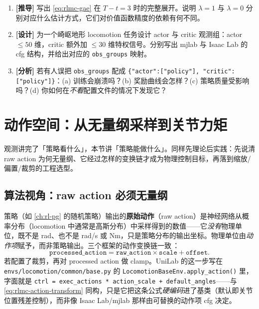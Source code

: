 \begin{practice}[练习·非对称观测]
\begin{enumerate}
  \item \textbf{[推导]} 写出 \cref{eq:rlmc-gae} 在 $T-t=3$ 时的完整展开。说明 $\lambda=1$ 与 $\lambda=0$ 分别对应什么估计方式，它们对价值函数精度的依赖有何不同。
  \item \textbf{[设计]} 为一个崎岖地形 locomotion 任务设计 actor 与 critic 观测组：actor $\le 50$ 维，critic 额外加 $\le 30$ 维特权信号。分别写出 mjlab 与 Isaac Lab 的 cfg 结构，并给出对应的 \verb|obs_groups| 映射。
  \item \textbf{[分析]} 若有人误把 \verb|obs_groups| 配成 \verb|{"actor":["policy"], "critic":["policy"]}|：(a) 训练会崩溃吗？(b) 奖励曲线会怎样？(c) 策略质量受影响吗？(d) 你如何在\emph{不看}配置文件的情况下发现它？
\end{enumerate}
\end{practice}

\section{动作空间：从无量纲采样到关节力矩}
\label{sec:rlmc-action}

观测讲完了「策略看什么」，本节讲「策略能做什么」。同样先理论后实践：先说清 raw action 为何无量纲、它经过怎样的变换链才成为物理控制目标，再落到缩放/偏置/裁剪的工程选型。

\subsection{算法视角：raw action 必须无量纲}
\label{sec:rlmc-rawaction}

策略（如 \cref{ch:rl-pg} 的随机策略）输出的\textbf{原始动作}（raw action）是神经网络从概率分布（locomotion 中通常是高斯分布）中采样得到的数值——它\emph{没有}物理单位，既不是 rad、也不是 rad/s 或 Nm，只是策略分布的输出坐标。物理单位由\emph{动作项}赋予，而非策略输出。三个框架的动作变换链一致\,\cite{isaaclab2024,mjlab2026,unilab2026}：
\begin{equation}
\texttt{processed\_action} = \texttt{raw\_action}\times\texttt{scale} + \texttt{offset}.
\label{eq:rlmc-action-transform}
\end{equation}
若配置了裁剪，再对 processed action 做 clamp。UniLab 的这一步写在 \verb|envs/locomotion/common/base.py| 的 \verb|LocomotionBaseEnv.apply_action()| 里，字面就是 \verb|ctrl = exec_actions * action_scale + default_angles|——与 \cref{eq:rlmc-action-transform} 同构，只是它把这条公式\emph{硬编码}进了基类（默认即关节位置残差控制），而非像 Isaac Lab/mjlab 那样由可替换的动作项 cfg 决定。

